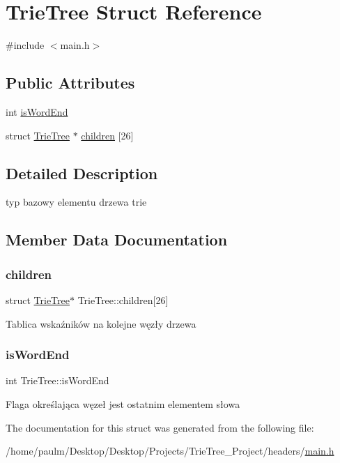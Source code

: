 \hypertarget{structTrieTree}{}\section{Trie\+Tree Struct Reference}
\label{structTrieTree}


{\ttfamily \#include $<$main.\+h$>$}

\subsection*{Public Attributes}
\begin{DoxyCompactItemize}
\item 
int \mbox{\hyperlink{structTrieTree_a87a0ce9b6494bed7524f99fc54ef8f35}{is\+Word\+End}}
\item 
struct \mbox{\hyperlink{structTrieTree}{Trie\+Tree}} $\ast$ \mbox{\hyperlink{structTrieTree_a4ec2425c326e2e6ca1c658b2a7606072}{children}} \mbox{[}26\mbox{]}
\end{DoxyCompactItemize}


\subsection{Detailed Description}
typ bazowy elementu drzewa trie 

\subsection{Member Data Documentation}
\mbox{\label{structTrieTree_a4ec2425c326e2e6ca1c658b2a7606072}} 
\subsubsection{\texorpdfstring{children}{children}}
{\footnotesize\ttfamily struct \mbox{\hyperlink{structTrieTree}{Trie\+Tree}}$\ast$ Trie\+Tree\+::children\mbox{[}26\mbox{]}}

Tablica wskaźników na kolejne węzły drzewa \mbox{\label{structTrieTree_a87a0ce9b6494bed7524f99fc54ef8f35}} 
\subsubsection{\texorpdfstring{isWordEnd}{isWordEnd}}
{\footnotesize\ttfamily int Trie\+Tree\+::is\+Word\+End}

Flaga określająca węzeł jest ostatnim elementem słowa 

The documentation for this struct was generated from the following file\+:\begin{DoxyCompactItemize}
\item 
/home/paulm/\+Desktop/\+Desktop/\+Projects/\+Trie\+Tree\+\_\+\+Project/headers/\mbox{\hyperlink{main_8h}{main.\+h}}\end{DoxyCompactItemize}
